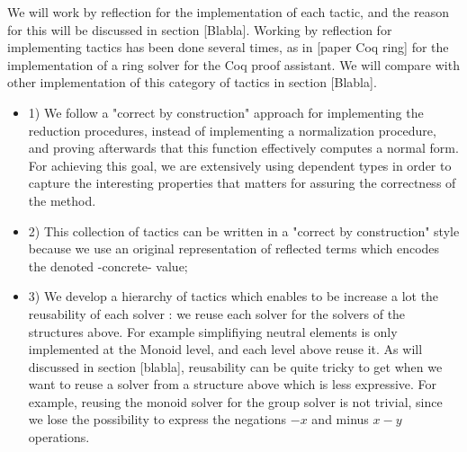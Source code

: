 We will work by reflection for the implementation of each tactic, and the reason for this will be discussed in section [Blabla]. Working by reflection for implementing tactics has been done several times, as in [paper Coq ring] for the implementation of a ring solver for the Coq proof assistant. We will compare with other implementation of this category of tactics in section [Blabla].
\begin{itemize}
	\item 1) We follow a "correct by construction" approach for implementing the reduction procedures, instead of implementing a normalization procedure, and proving afterwards that this function effectively computes a normal form. For achieving this goal, we are extensively using dependent types in order to capture the interesting properties that matters for assuring the correctness of the method. 
	\item 2) This collection of tactics can be written in a "correct by construction" style because we use an original representation of reflected terms which encodes the denoted -concrete- value;
	\item 3) We develop a hierarchy of tactics which enables to be increase a lot the reusability of each solver : we reuse each solver for the solvers of the structures above. For example simplifiying neutral elements is only implemented at the Monoid level, and each level above reuse it. As will discussed in section [blabla], reusability can be quite tricky to get when we want to reuse a solver from a structure above which is less expressive. For example, reusing the monoid solver for the group solver is not trivial, since we lose the possibility to express the negations $-x$ and minus $x-y$ operations.
\end{itemize}